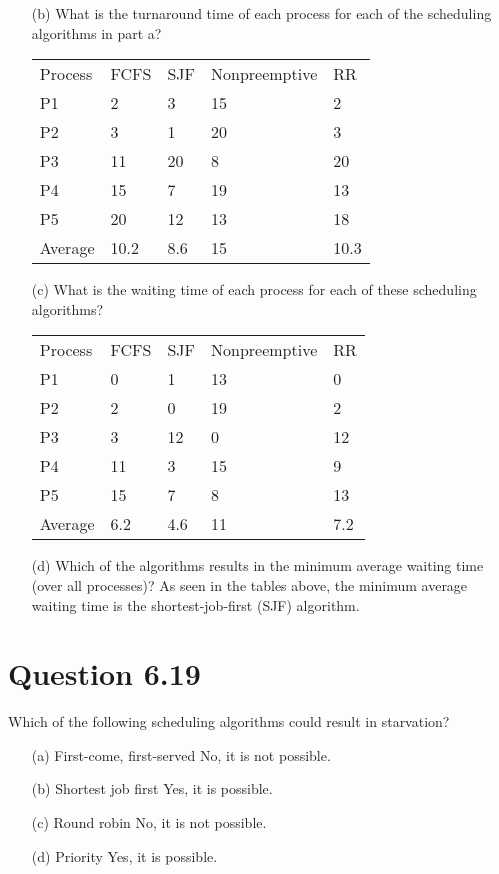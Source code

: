 \documentclass[12pt]{article}
\begin{document}
{\begin{enumerate}
\newpage
\item[(b)]What is the turnaround time of each process for each of the scheduling algorithms in part a?
\\
{\color{black}
\begin{table}[h]
\begin{tabular}{lllll}
Process & FCFS & SJF & Nonpreemptive & RR \\
P1      & 2    & 3  & 15       & 2 \\
P2      & 3    & 1   & 20       & 3  \\
P3      & 11   & 20  & 8        & 20 \\
P4      & 15   & 7   & 19       & 13  \\
P5      & 20   & 12   & 13       & 18 \\
Average & 10.2  & 8.6   & 15      &   10.3 
\end{tabular}
\end{table}
}

\item[(c)]What is the waiting time of each process for each of these scheduling algorithms?
\\
{\color{black}
\begin{table}[h1]
\begin{tabular}{lllll}
Process & FCFS & SJF & Nonpreemptive & RR   \\
P1      & 0    & 1   & 13        & 0    \\
P2      & 2    & 0   & 19        & 2    \\
P3      & 3    & 12  & 0        & 12   \\
P4      & 11   & 3   & 15       & 9    \\
P5      & 15   & 7   & 8       & 13    \\
Average & 6.2  & 4.6   & 11      & 7.2
\end{tabular}
\end{table}
}

\item[(d)]Which of the algorithms results in the minimum average waiting time (over all processes)? {\color{black}As seen in the tables above, the minimum average waiting time is the shortest-job-first (SJF) algorithm. }
\end{enumerate}
}

\section*{Question 6.19} {\color{blue}Which of the following scheduling algorithms could result in starvation?
\begin{enumerate}
\item[(a)]First-come, first-served {\color{black} No, it is not possible.}
\item[(b)]Shortest job first {\color{black} Yes, it is possible.}
\item[(c)]Round robin {\color{black} No, it is not possible.}
\item[(d)]Priority {\color{black} Yes, it is possible.}
\end{enumerate}
}
\end{document}
